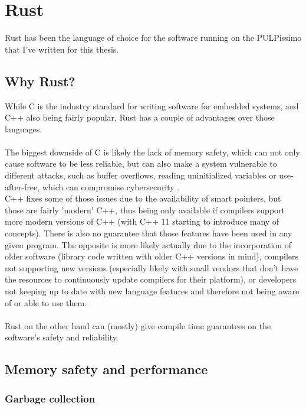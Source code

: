 \section{Rust}

Rust \cite{rustlang} has been the language of choice for the software running on the PULPissimo \cite{pulpissimo} that I've written for this thesis.

\subsection{Why Rust?}

While C is the industry standard for writing software for embedded systems, and C++ also being fairly popular, Rust has a couple of
advantages over those languages.\\\\
The biggest downside of C is likely the lack of memory safety, which can not only cause software to be less reliable, but
can also make a system vulnerable to different attacks, such as buffer overflows, reading uninitialized variables or use-after-free, which can compromise cybersecurity \cite{memory_safety}.\\
C++ fixes some of those issues due to the availability of smart pointers, but those are fairly 'modern' C++, thus being only available if compilers support more modern
versions of C++ (with C++ 11 starting to introduce many of concepts).
There is also no guarantee that those features have been used in any given program.
The opposite is more likely actually due to the incorporation of older software (library code written with older C++ versions in mind),
compilers not supporting new versions (especially likely with small vendors that don't have the resources to continuously update compilers for their platform),
or developers not keeping up to date with new language features and therefore not being aware of or able to use them.\\\\
Rust on the other hand can (mostly) give compile time guarantees on the software's safety and reliability.

\subsection{Memory safety and  performance}

\subsubsection{Garbage collection}

